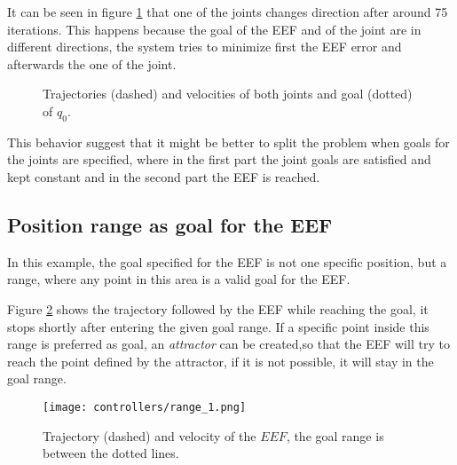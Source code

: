 It can be seen in figure \ref{fig:joint_0} that one of the joints changes direction after around 75 iterations. This happens because the goal of the EEF and of the joint are in different directions, the system tries to minimize first the EEF error and afterwards the one of the joint.
\begin{figure}[H]
	\centering
	\begin{subfigure}[][Joint $q_{0}$]
		{\texttt{[image: controllers/joint\_q0.png]}}
	\end{subfigure}
	\begin{subfigure}[][Joint $q_{1}$]
		{\texttt{[image: controllers/joint\_q1.png]}}
	\end{subfigure}
	\vspace{-12pt}
	\caption[Joint and EEF goal: Joints Trajectories]{Trajectories (dashed) and velocities of both joints and goal (dotted) of $q_{0}$.}
	\vspace{-10pt}
	\label{fig:joint_0}
\end{figure}

 This behavior suggest  that it might be better to split the problem when goals for the joints are specified, where in the first part the joint goals are satisfied and kept constant and in the second part the EEF is reached.


\subsection{Position range as goal for the EEF}

In this example, the goal specified for the EEF is not one specific position, but a range, where any point in this area is a valid goal for the EEF.

Figure \ref{fig:range_1} shows the trajectory followed by the EEF while reaching the goal, it stops shortly after entering the given goal range. If a specific point inside this range is preferred as goal, an \textit{attractor} can be created,so that the EEF will try to reach the point defined by the attractor, if it is not possible, it will stay in the goal range.
\begin{figure}[H]
	\centering
	\texttt{[image: controllers/range\_1.png]}
	\vspace{-10pt}
	\caption[Position range as goal]{Trajectory (dashed) and velocity of the $EEF$, the goal range is between the dotted lines.}
	\vspace{-15pt}
	\label{fig:range_1}
\end{figure}

